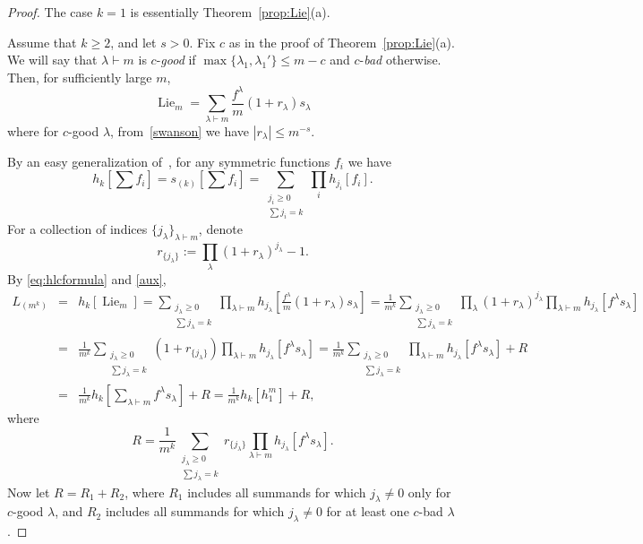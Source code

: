 \documentclass[12pt]%
{amsart}
\newcommand{\la}{{\lambda}}
\newcommand{\Lie}{\operatorname{Lie}}
\theoremstyle{plain}
\theoremstyle{definition}
\theoremstyle{remark}
\begin{document}
\begin{proof}
    The case $k=1$ is essentially Theorem~\ref{prop:Lie}(a).

    Assume that $k \ge 2$, and let $s > 0$.
    Fix $c$ as in the proof of Theorem~\ref{prop:Lie}(a). We will say that 
    $\la\vdash m$ is $c$-\textit{good} if $\max\{\la_1,\la_1'\}\le m-c$ and 
    $c$-\textit{bad} otherwise.
    Then, for sufficiently large $m$,
    \begin{equation}\label{aux}
        \Lie_m
        = \sum_{\la\vdash m}\frac{f^\la}m(1+r_\la) s_\la
    \end{equation}
    where for $c$-good $\la$, from~\eqref{swanson} we have $|r_\la|\le m^{-s}$.

By an easy generalization of~\cite[(8.8)]{Macdonald}, for any symmetric functions $f_i$ we have
\[
    h_k \left[ \sum f_i \right]
    = s_{(k)} \left[ \sum f_i \right]
    = \sum_{\substack{j_i \ge 0 \\ \sum j_i=k}}\prod_i h_{j_i}[f_i].
\]
For a collection of indices $\{j_\la\}_{\la\vdash m}$, denote 
\[
    r_{\{j_\la\}}
    := \prod_\la(1+r_\la)^{j_\la}-1.
\]
By \eqref{eq:hlcformula} and \eqref{aux},
\begin{eqnarray}
    L_{(m^k)}
    &=& h_k[\Lie_m] 
    = \sum_{\substack{j_\la \ge 0 \\ \sum j_\la=k}} \prod_{\la \vdash m}h_{j_\la} \left[ \frac{f^\la}m(1+r_\la) s_\la \right] 
    = \frac{1}{m^k} \sum_{\substack{j_\la \ge 0 \\ \sum j_\la=k}} \prod_\la(1+r_\la)^{j_\la} \prod_{\la\vdash m} h_{j_\la} \left[ f^\la s_\la \right] \nonumber \\
    &=& \frac{1}{m^k}\sum_{\substack{j_\la \ge 0 \\ \sum j_\la=k}} (1+r_{\{j_\la\}}) \prod_{\la \vdash m} h_{j_\la} \left[ f^\la s_\la \right]
    = \frac{1}{m^k}\sum_{\substack{j_\la \ge 0 \\ \sum j_\la=k}} \prod_{\la \vdash m} h_{j_\la} \left[f^\la s_\la \right] + R \nonumber \\
    &=& \frac{1}{m^k}h_k \left[ \sum_{\la \vdash m} f^\la s_\la \right] + R 
    = \frac{1}{m^k}h_k \left[h_1^m \right] + R, 
\label{eq:R}
\end{eqnarray}
where
\[
    R = \frac{1}{m^k}\sum_{\substack{j_\la \ge 0 \\ \sum j_\la=k}} r_{\{j_\la\}} \prod_{\la\vdash m} h_{j_\la}\left[f^\la s_\la\right].
\]
Now let $R=R_1+R_2$,
where $R_1$ includes all summands for which $j_\la \ne 0$ only for $c$-good $\la$, and $R_2$ includes all summands for which $j_\la\ne0$ for at least one $c$-bad $\la$.


\end{proof}
\end{document}

